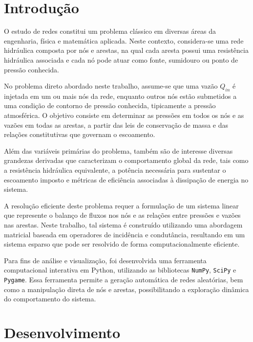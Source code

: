 \documentclass{article}
\begin{document}
\section{Introdução}

\par O estudo de redes constitui um problema clássico em diversas áreas da engenharia, física e matemática aplicada. Neste contexto, considera-se uma rede hidráulica composta por nós e arestas, na qual cada aresta possui uma resistência hidráulica associada e cada nó pode atuar como fonte, sumidouro ou ponto de pressão conhecida.

No problema direto abordado neste trabalho, assume-se que uma vazão $Q_{in}$ é injetada em um ou mais nós da rede, enquanto outros nós estão submetidos a uma condição de contorno de pressão conhecida, tipicamente a pressão atmosférica. O objetivo consiste em determinar as pressões em todos os nós e as vazões em todas as arestas, a partir das leis de conservação de massa e das relações constitutivas que governam o escoamento.

Além das variáveis primárias do problema, também são de interesse diversas grandezas derivadas que caracterizam o comportamento global da rede, tais como a resistência hidráulica equivalente, a potência necessária para sustentar o escoamento imposto e métricas de eficiência associadas à dissipação de energia no sistema.

A resolução eficiente deste problema requer a formulação de um sistema linear que represente o balanço de fluxos nos nós e as relações entre pressões e vazões nas arestas. Neste trabalho, tal sistema é construído utilizando uma abordagem matricial baseada em operadores de incidência e condutância, resultando em um sistema esparso que pode ser resolvido de forma computacionalmente eficiente.

Para fins de análise e visualização, foi desenvolvida uma ferramenta computacional interativa em Python, utilizando as bibliotecas \texttt{NumPy}, \texttt{SciPy} e \texttt{Pygame}. Essa ferramenta permite a geração automática de redes aleatórias, bem como a manipulação direta de nós e arestas, possibilitando a exploração dinâmica do comportamento do sistema.

\section{Desenvolvimento}
\end{document}
